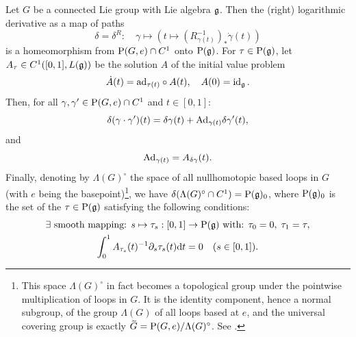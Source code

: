 \begin{lem}[{{\cite[Prop.~1.13.4]{DK}}}]\label{lem invertibility of D}
    Let $G$ be a connected Lie group with Lie algebra $\mathfrak{g}$. Then the (right) logarithmic derivative as a map of paths
    \[\delta=\delta^R:\quad \gamma\mapsto \left(t\mapsto \left(R_{\gamma(t)}^{-1}\right)_\ast\dot\gamma(t)\right)\]
    is a homeomorphism from $\mathrm{P}(G,e)\cap C^1$ onto $\mathrm{P}(\mathfrak{g})$. For $\tau\in \mathrm{P}(\mathfrak{g})$, let $A_\tau\in C^1([0,1],\boldsymbol{\mathrm{\mathrm}}{L}(\mathfrak{g}))$
    be the solution $A$ of the initial value problem
    \[\dot A(t)=\mathrm{ad}_{\tau(t)}\circ A(t),\quad A(0)=\operatorname{id}_{\mathfrak{g}}.\label{1792}\]
    Then, for all $\gamma,\gamma'\in \mathrm{P}(G,e)\cap C^1$ and $t\in [0,1]$:
    \[\delta(\gamma\cdot \gamma')(t)=\delta\gamma(t)+\mathrm{Ad}_{\gamma(t)}\delta \gamma'(t),\label{1794}\]
    and 
    \[\mathrm{Ad}_{\gamma(t)}=A_{\delta \gamma}(t).\]
    Finally, denoting by $\Lambda(G)^\circ$ the space of all nullhomotopic based loops in $G$ (with $e$ being the basepoint)\footnote{This space $\Lambda(G)^\circ$ in fact becomes a topological group under the pointwise multiplication of loops in $G$. It is the identity component, hence a normal subgroup, of the group $\Lambda(G)$ of all loops based at $e$, and the universal covering group is exactly $\wt{G}=\rmP(G,e)\slash\Lambda(G)^\circ$. See \cite[Prop.~1.13.2]{DK}.}, we have $\delta(\Lambda(G)^\circ\cap C^1)=\mathrm{P}(\mathfrak{g})_0$,
    where $\mathrm{P}(\mathfrak{g})_0$ is the set of the $\tau\in\mathrm{P}(\mathfrak{g})$ satisfying the following conditions:
    \begin{gather}
        \exists \text{ smooth mapping: } s\mapsto \tau_s:[0,1]\to \mathrm{P}(\mathfrak{g})\text{ with: } \tau_0=0,\;\tau_1=\tau,\\
        \int_0^1 A_{\tau_s}(t)^{-1}\partial_s\tau_s(t){\mathrm{d}} t=0\quad (s\in [0,1]).
    \end{gather}
\end{lem}
